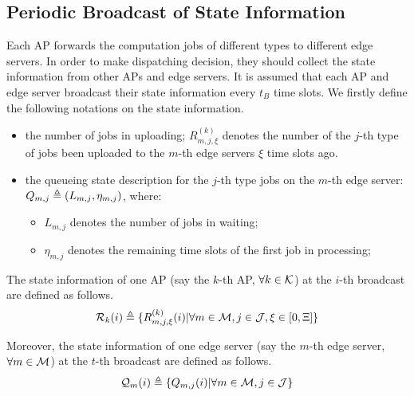 
\subsection{Periodic Broadcast of State Information}
Each AP forwards the computation jobs of different types to different edge servers.
In order to make dispatching decision, they should collect the state information from other APs and edge servers.
It is assumed that each AP and edge server broadcast their state information every $t_B$ time slots.
We firstly define the following notations on the state information.
\begin{itemize}
    \item the number of jobs in uploading;
        $R^{(k)}_{m,j,\xi}$ denotes the number of the $j$-th type of jobs been uploaded to the $m$-th edge servers $\xi$ time slots ago.
    \item the queueing state description for the $j$-th type jobs on the $m$-th edge server: $Q_{m,j} \triangleq (L_{m,j}, \eta_{m,j})$, where:
    \begin{itemize}
        \item $L_{m,j}$ denotes the number of jobs in waiting;
        \item $\eta_{m,j}$ denotes the remaining time slots of the first job in processing;
    \end{itemize}
\end{itemize}

The state information of one AP (say the $k$-th AP, $\forall k\in\mathcal{K}$) at the $i$-th broadcast are defined as follows.
\begin{align}
    \mathcal{R}_{k}(i) \triangleq \{R^{(k)}_{m,j,\xi}(i) | \forall m\in\mathcal{M}, j\in\mathcal{J}, \xi \in [0,\Xi]\}
\end{align}

Moreover, the state information of one edge server (say the $m$-th edge server, $\forall m\in\mathcal{M}$) at the $t$-th broadcast are defined as follows.
\begin{align}
    \mathcal{Q}_{m}(i) \triangleq \{Q_{m,j}(i) | \forall m\in\mathcal{M}, j\in\mathcal{J}\}
\end{align}

